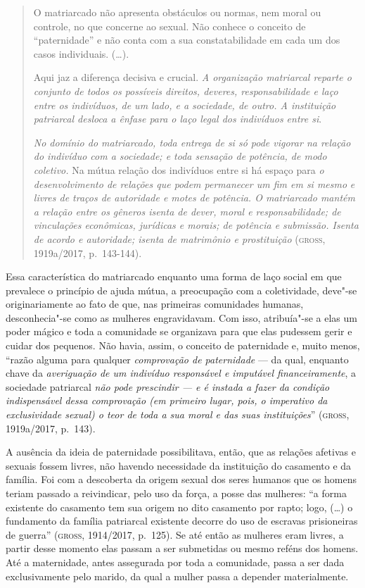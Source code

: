 \begin{quote}
O matriarcado não apresenta obstáculos ou normas, nem moral ou controle,
no que concerne ao sexual. Não conhece o conceito de ``paternidade'' e
não conta com a sua constatabilidade em cada um dos casos individuais.
(\ldots{}).

Aqui jaz a diferença decisiva e crucial. \emph{A organização matriarcal
reparte o conjunto de todos os possíveis direitos, deveres,
responsabilidade e laço entre os indivíduos, de um lado, e a sociedade,
de outro. A instituição patriarcal desloca a ênfase para o laço legal
dos indivíduos entre si}.

\emph{No domínio do matriarcado, toda entrega de si só pode vigorar na
relação do indivíduo com a sociedade; e toda sensação de potência, de
modo coletivo.} Na mútua relação dos indivíduos entre si há espaço para
\emph{o desenvolvimento de relações que podem permanecer um fim em si
mesmo} \emph{e livres de traços de autoridade e motes de potência. O
matriarcado mantém a relação entre os gêneros isenta de dever, moral e
responsabilidade; de vinculações econômicas, jurídicas e morais; de
potência e submissão. Isenta de acordo e autoridade; isenta de
matrimônio e prostituição} (\textsc{gross}, 1919a/2017, p.~143-144).
\end{quote}

Essa característica do matriarcado enquanto uma forma de laço social em
que prevalece o princípio de ajuda mútua, a preocupação com a
coletividade, deve"-se originariamente ao fato de que, nas primeiras
comunidades humanas, desconhecia"-se como as mulheres engravidavam. Com
isso, atribuía"-se a elas um poder mágico e toda a comunidade se
organizava para que elas pudessem gerir e cuidar dos pequenos. Não
havia, assim, o conceito de paternidade e, muito menos, ``razão alguma
para qualquer \emph{comprovação de paternidade} --- da qual, enquanto
chave da \emph{averiguação de um indivíduo responsável e imputável
financeiramente}, a sociedade patriarcal \emph{não pode prescindir --- e
é instada a fazer da condição indispensável dessa comprovação (em
primeiro lugar, pois, o imperativo da exclusividade sexual) o teor de
toda a sua moral e das suas instituições}'' (\textsc{gross}, 1919a/2017, p.~143).

A ausência da ideia de paternidade possibilitava, então, que as relações
afetivas e sexuais fossem livres, não havendo necessidade da instituição
do casamento e da família. Foi com a descoberta da origem sexual dos
seres humanos que os homens teriam passado a reivindicar, pelo uso da
força, a posse das mulheres: ``a forma existente do casamento tem sua
origem no dito casamento por rapto; logo, (\ldots{}) o fundamento da família
patriarcal existente decorre do uso de escravas prisioneiras de guerra'' (\textsc{gross}, 1914/2017, p.~125).
Se até então as mulheres eram livres, a partir desse momento elas
passam a ser submetidas ou mesmo reféns dos homens. Até a maternidade,
antes assegurada por toda a comunidade, passa a ser dada exclusivamente
pelo marido, da qual a mulher passa a depender materialmente.

